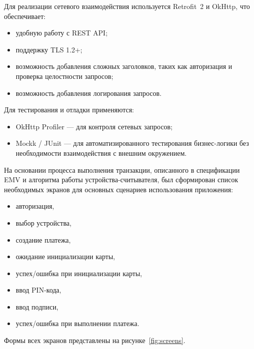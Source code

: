 Для реализации сетевого взаимодействия используется Retrofit~2 и OkHttp, что обеспечивает:

\begin{itemize}
    \item удобную работу с REST API;
    \item поддержку TLS 1.2+;
    \item возможность добавления сложных заголовков, таких как авторизация и проверка целостности запросов;
    \item возможность  добавления логирования запросов.
\end{itemize}

Для тестирования и отладки применяются:

\begin{itemize}
    \item OkHttp Profiler — для контроля сетевых запросов;
    \item Mockk / JUnit — для автоматизированного тестирования бизнес-логики без необходимости взаимодействия с внешним окружением.
\end{itemize}

На основании процесса выполнения транзакции, описанного в спецификации EMV и алгоритма работы устройства-считывателя, был сформирован список необходимых экранов для основных сценариев использования приложения:
\begin{itemize}
    \item авторизация,
    \item выбор устройства,
    \item создание платежа,
    \item ожидание инициализации карты,
    \item успех/ошибка при инициализации карты,
    \item ввод PIN-кода,
    \item ввод подписи,
    \item успех/ошибка при выполнении платежа.
\end{itemize}

Формы всех экранов представлены на рисунке~\ref{fig:screens}.

